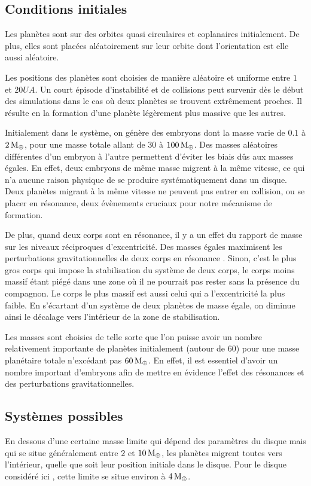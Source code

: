 \subsection{Conditions initiales}
Les planètes sont sur des orbites quasi circulaires et coplanaires initialement. De plus, elles sont placées aléatoirement sur leur orbite dont l'orientation est elle aussi aléatoire.

Les positions des planètes sont choisies de manière aléatoire et uniforme entre $1$ et $20\unit{UA}$. Un court épisode d'instabilité et de collisions peut survenir dès le début des simulations dans le cas où deux planètes se trouvent extrêmement proches. Il résulte en la formation d'une planète légèrement plus massive que les autres. 

Initialement dans le système, on génère des embryons dont la masse varie de $0.1$ à $2\mathrm{\thinspace M_\oplus}$, pour une masse totale allant de $30$ à $100\mathrm{\thinspace M_\oplus}$. Des masses aléatoires différentes d'un embryon à l'autre permettent d'éviter les biais dûs aux masses égales. En effet, deux embryons de même masse migrent à la même vitesse, ce qui n'a aucune raison physique de se produire systématiquement dans un disque. Deux planètes migrant à la même vitesse ne peuvent pas entrer en collision, ou se placer en résonance, deux évènements cruciaux pour notre mécanisme de formation. 

De plus, quand deux corps sont en résonance, il y a un effet du rapport de masse sur les niveaux réciproques d'excentricité. Des masses égales maximisent les perturbations gravitationnelles de deux corps en résonance . Sinon, c'est le plus gros corps qui impose la stabilisation du système de deux corps, le corps moins massif étant piégé dans une zone où il ne pourrait pas rester sans la présence du compagnon. Le corps le plus massif est aussi celui qui a l'excentricité la plus faible. En s'écartant d'un système de deux planètes de masse égale, on diminue ainsi le décalage vers l'intérieur de la zone de stabilisation.

Les masses sont choisies de telle sorte que l'on puisse avoir un nombre relativement importante de planètes initialement (autour de 60) pour une masse planétaire totale n'excédant pas $60\mathrm{\thinspace M_\oplus}$. En effet, il est essentiel d'avoir un nombre important d'embryons afin de mettre en évidence l'effet des résonances et des perturbations gravitationnelles. 

\subsection{Systèmes possibles}
En dessous d'une certaine masse limite qui dépend des paramètres du disque mais qui se situe généralement entre $2$ et $10\mathrm{\thinspace M_\oplus}$, les planètes migrent toutes vers l'intérieur, quelle que soit leur position initiale dans le disque. Pour le disque considéré ici , cette limite se situe environ à $4\mathrm{\thinspace M_\oplus}$.

